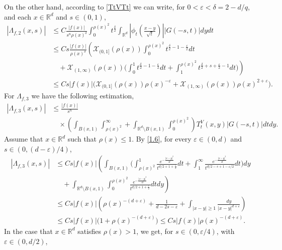 \documentclass[10pt, a4paper, reqno]{amsart}
\theoremstyle{definition}
\theoremstyle{remark}
\numberwithin{equation}{section}
\begin{document}
On the other hand, according to \eqref{TtVTt} we can write, for $0<\varepsilon <\delta=2-d/q$, and each $x\in \mathbb R^d$ and $s\in (0,1)$, 
\begin{align*}
|\Lambda_{f,2}(x,s)|&\leq C\frac{|f(x)|}{s^n\rho (x)^\delta}\int_0^{\rho (x)^2}t^{\tfrac{\delta}{2}}\int_{\mathbb R^d}\left|\phi _t\left(\frac{x-y}{\sqrt{t}}\right)\right||G(-s,t)|dydt\\
&\leq Cs\frac{|f(x)|}{\rho (x)^\delta}\left(\mathcal X_{(0,1]}(\rho (x))\int_0^{\rho (x)^2}t^{\tfrac{\delta}{2}-1-\tfrac{\varepsilon}{2}}dt\right.\\
&\quad +\left.\mathcal X_{(1,\infty )}(\rho (x))\Big(\int_0^1t^{\tfrac{\delta}{2}-1-\tfrac{\varepsilon}{2}}dt+\int_1^{\rho (x)^2}t^{\tfrac{\delta}{2}+s+\tfrac{\varepsilon}{2} -1}dt\Big)\right)\\
&\leq Cs|f(x)|\big(\mathcal X_{(0,1]}(\rho (x))\rho (x)^{-\varepsilon}+\mathcal X_{(1,\infty )}(\rho (x))\rho (x)^{2+\varepsilon}\big).
\end{align*}
For $\Lambda_{f,3}$ we have the following estimation,
\begin{align*}
 |\Lambda_{f,3}(x,s)|&\leq \frac{|f(x)|}{s^n}\\
 &\quad  \times \left(\int_{B(x,1)}\int_{\rho (x)^2}^\infty +\int_{\mathbb R^d\setminus B(x,1)}\int_0^{\rho (x)^2}\right)T_t^V(x,y)|G(-s,t)|dtdy.
 \end{align*}
 Assume that $x\in \mathbb R^d$ such that $\rho (x)\leq 1$. By \eqref{1.6}, for every $\varepsilon \in (0,d)$ and $s\in (0,(d-\varepsilon)/4)$,
 \begin{align*}
    |\Lambda_{f,3}(x,s)|&\leq Cs|f(x)|\left(\int_{B(x,1)}\Big(\int_{\rho (x)^2}^1\frac{e^{-\frac{|x-y|^2}{4t}}}{t^{d/2+1+\tfrac{\varepsilon}{2}}}dt+\int_1^\infty \frac{e^{-\frac{|x-y|^2}{4t}}}{t^{d/2-s+1-\varepsilon /2}}dt\Big)dy\right.\\
    &\left.\quad +\int_{\mathbb R^d\setminus B(x,1)}\int_0^{\rho (x)^2}\frac{e^{-\frac{|x-y|^2}{4t}}}{t^{d/2+1+\tfrac{\varepsilon}{2}}}dtdy\right)\\
    &\leq Cs|f(x)|\left(\rho (x)^{-(d+\varepsilon)}+\frac{1}{d-2s-\varepsilon}+\int_{|x-y|\geq 1}\frac{dy}{|x-y|^{d+\varepsilon}}\right)\\
    &\leq Cs|f(x)|\Big(1+\rho (x)^{-(d+\varepsilon)}\Big)\leq Cs|f(x)|\rho (x)^{-(d+\varepsilon)}. 
\end{align*}
In the case that $x\in \mathbb R^d$ satisfies $\rho (x)>1$, we get, for $s\in (0,\varepsilon /4)$, with $\varepsilon \in (0,d/2)$,
\end{document}
